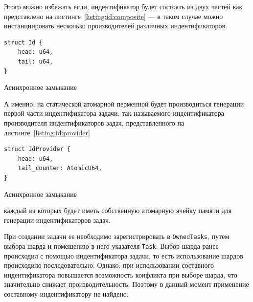 Этого можно избежать если, индентификатор будет состоять из двух частей как представлено на листинге~\ref{listing:id:composite} --- в таком случае можно инстанциировать несколько производителей различных индентификаторов.

\begin{listing}[H]
    \begin{verbatim}
struct Id {
    head: u64,
    tail: u64,
}
    \end{verbatim}

    \caption{Асинхронное замыкание}
    \label{listing:id:composite}
\end{listing}

А именно: на статической атомарной перменной будет производиться генерации первой части индентификатора задачи, так называемого индентификатора производителя индентификаторов задач, представленного на листинге~\ref{listing:id:provider}

\begin{listing}[H]
    \begin{verbatim}
struct IdProvider {
    head: u64,
    tail_counter: AtomicU64,
}
    \end{verbatim}

    \caption{Асинхронное замыкание}
    \label{listing:id:provider}
\end{listing}

каждый из которых будет иметь собственную атомарную ячейку памяти для генерации индентификаторов задач.

При создании задачи ее необходимо зарегистрировать в \verb|OwnedTasks|, путем выбора шарда и помещению в него указателя \verb|Task|. Выбор шарда ранее происходил с помощью индентификатора задачи, то есть использование шардов происходило последовательно. Однако, при использовании составного индентификатора повышается возможность конфликта при выборе шарда, что значительно снижает производительность. Поэтому в данный момент применение составному индентификатору не найдено.
